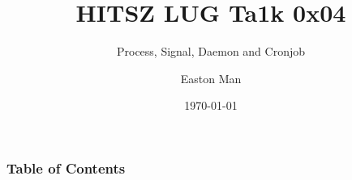 \documentclass[aspectratio=169]{beamer}
\title{HITSZ LUG Ta1k 0x04}
\subtitle{Process, Signal, Daemon and Cronjob}
\author{Easton Man}
\institute[HITSZ]{Harbin Institute of Technology \(ShenZhen\)}
\date{\today}
\begin{document}
\frame{\titlepage}

\begin{frame}
    \frametitle{Table of Contents}
    \tableofcontents
\end{frame}







\end{document}
